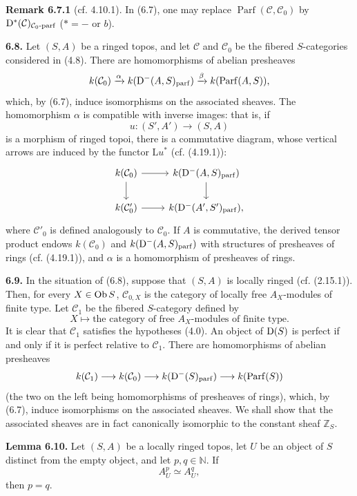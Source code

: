 \documentclass[11pt]{article}
\newcommand{\Parf}{\operatorname{Parf}}
\begin{document}
\textbf{Remark 6.7.1} (cf. 4.10.1). In (6.7), one may replace \(\Parf(\mathcal C,\mathcal C_0)\) by \(\mathrm D^*(\mathcal C)_{\mathcal C_0\text{-}\mathrm{parf}}\) (\(*=-\) or \(b\)).

\textbf{6.8.} Let \((S,A)\) be a ringed topos, and let \(\mathcal C\) and \(\mathcal C_0\) be the fibered \(S\)-categories considered in (4.8). There are homomorphisms of abelian presheaves
\[
  k(\mathcal C_0)
  \xrightarrow{\alpha}
  k(\Dpx^-(A,S)_{\mathrm{parf}})
  \xrightarrow{\beta}
  k(\Parf(A,S)),
\]
which, by (6.7), induce isomorphisms on the associated sheaves. The homomorphism \(\alpha\) is compatible with inverse images: that is, if
\[
  u:(S',A')\longrightarrow(S,A)
\]
is a morphism of ringed topoi, there is a commutative diagram, whose vertical arrows are induced by the functor \(\mathrm L u^*\) (cf. (4.19.1)):
\[
\begin{tikzcd}
 k(\mathcal C_0) \arrow[r] \arrow[d] & k(\Dpx^-(A,S)_{\mathrm{parf}}) \arrow[d]\\
 k(\mathcal C'_0) \arrow[r] & k(\Dpx^-(A',S')_{\mathrm{parf}}),
\end{tikzcd}
\]
where \(\mathcal C'_0\) is defined analogously to \(\mathcal C_0\). If \(A\) is commutative, the derived tensor product endows \(k(\mathcal C_0)\) and \(k(\mathrm D^-(A,S)_{\mathrm{parf}})\) with structures of presheaves of rings (cf. (4.19.1)), and \(\alpha\) is a homomorphism of presheaves of rings.

\textbf{6.9.} In the situation of (6.8), suppose that \((S,A)\) is locally ringed (cf. (2.15.1)). Then, for every \(X\in\operatorname{Ob} S\), \(\mathcal C_{0,X}\) is the category of locally free \(A_X\)-modules of finite type. Let \(\mathcal C_1\) be the fibered \(S\)-category defined by
\[
  X\longmapsto\text{the category of free }A_X\text{-modules of finite type}.
\]
It is clear that \(\mathcal C_1\) satisfies the hypotheses (4.0). An object of \(\mathrm D(S)\) is perfect if and only if it is perfect relative to \(\mathcal C_1\). There are homomorphisms of abelian presheaves
\[
  k(\mathcal C_1)\longrightarrow k(\mathcal C_0)\longrightarrow
  k(\Dpx^-(S)_{\mathrm{parf}})\longrightarrow k(\Parf(S))
\]
(the two on the left being homomorphisms of presheaves of rings), which, by (6.7), induce isomorphisms on the associated sheaves. We shall show that the associated sheaves are in fact canonically isomorphic to the constant sheaf \(\mathbb Z_S\).

\textbf{Lemma 6.10.} Let \((S,A)\) be a locally ringed topos, let \(U\) be an object of \(S\) distinct from the empty object, and let \(p,q\in\mathbb N\). If
\[
  A_U^p\simeq A_U^q,
\]
then \(p=q\).
\end{document}
